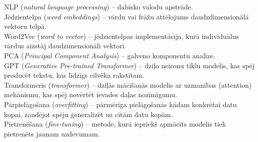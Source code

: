 NLP (\textit{natural language processing}) -- dabisko valodu apstrāde.\\
Jēdzientelpa (\textit{word embeddings}) -- vārdu vai frāžu attēlojums daudzdimensionālā vektoru telpā.\\
Word2Vec (\textit{word to vector}) -- jēdzientelpas implementācija, kurā individuālus vārdus aizstāj daudzimensionāli vektori.\\
PCA (\textit{Principal Component Analysis}) -- galveno komponentu analīze.\\
GPT (\textit{Generative Pre-trained Transformer}) – dziļo neironu tīklu modelis, kas spēj producēt tekstu, kas līdzīgs cilvēka rakstītam.\\
Transformeris (\textit{transformer}) -- dziļās mācīšanās modelis ar uzmanības (attention) mehānismu, kas spēj novērtēt ievades daļas nozīmīgumu.\\
Pārpielāgošana (\textit{overfitting}) -- pārmērīga pielāgošanās kādam konkrētai datu kopai, zaudējot spēju ģeneralizēt uz citām datu kopām.\\
Pietrenēšana (\textit{fine-tuning}) -- metode, kurā iepriekš apmācīts modelis tiek pietrenēts jaunam uzdevumam.